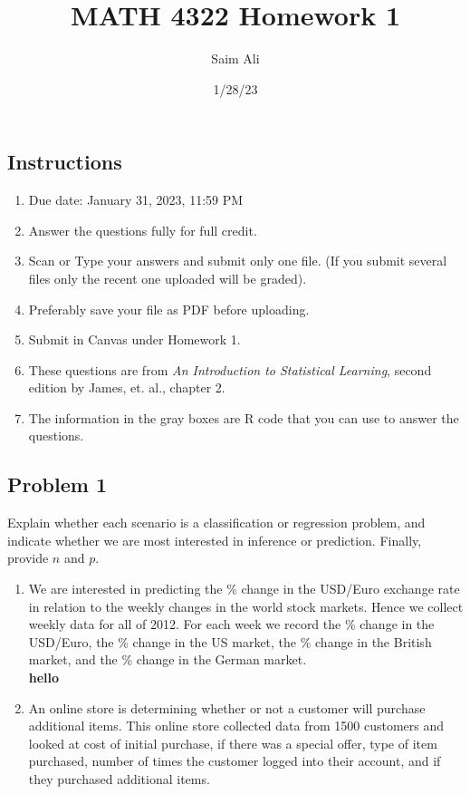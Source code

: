 \documentclass[
]{article}
\title{MATH 4322 Homework 1}
\author{Saim Ali}
\date{1/28/23}
\providecommand{\tightlist}{%
  \setlength{\itemsep}{0pt}\setlength{\parskip}{0pt}}
\begin{document}
\maketitle

\hypertarget{instructions}{%
\subsection{Instructions}\label{instructions}}

\begin{enumerate}
\def\labelenumi{\arabic{enumi}.}
\tightlist
\item
  Due date: January 31, 2023, 11:59 PM
\item
  Answer the questions fully for full credit.
\item
  Scan or Type your answers and submit only one file. (If you submit
  several files only the recent one uploaded will be graded).
\item
  Preferably save your file as PDF before uploading.
\item
  Submit in Canvas under Homework 1.
\item
  These questions are from \emph{An Introduction to Statistical
  Learning}, second edition by James, et. al., chapter 2.
\item
  The information in the gray boxes are R code that you can use to
  answer the questions.
\end{enumerate}

\hypertarget{problem-1}{%
\subsection{Problem 1}\label{problem-1}}

Explain whether each scenario is a classification or regression problem,
and indicate whether we are most interested in inference or prediction.
Finally, provide \(n\) and \(p\).

\begin{enumerate}
\def\labelenumi{\alph{enumi})}
\tightlist
\item
  We are interested in predicting the \% change in the USD/Euro exchange
  rate in relation to the weekly changes in the world stock markets.
  Hence we collect weekly data for all of 2012. For each week we record
  the \% change in the USD/Euro, the \% change in the US market, the \%
  change in the British market, and the \% change in the German
  market.\\
  \textbf{hello }
\item
  An online store is determining whether or not a customer will purchase
  additional items. This online store collected data from 1500 customers
  and looked at cost of initial purchase, if there was a special offer,
  type of item purchased, number of times the customer logged into their
  account, and if they purchased additional items.
\end{enumerate}
\end{document}
